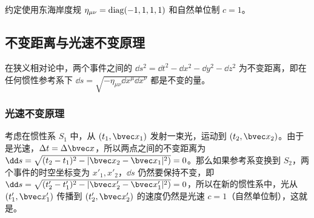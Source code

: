 

约定使用东海岸度规 $\eta_{\mu\nu}=\rm{diag}(-1,1,1,1)$ 和自然单位制 $c=1$。
\subsection{不变距离与光速不变原理}
在狭义相对论中，两个事件之间的 $\dd s^2=\dd t^2-\dd x^2-\dd y^2-\dd z^2$ 为不变距离，即在任何惯性参考系下 $\dd s=\sqrt{-\eta_{\mu\nu}\dd x^\mu \dd x^\nu}$ 都是不变的量。

\subsubsection{光速不变原理}

考虑在惯性系 $S_1$ 中，从 $(t_1,\bvec x_1)$ 发射一束光，运动到 $(t_2,\bvec x_2)$。由于是光速，$\Delta t=\Delta \bvec x$，所以两点之间的不变距离为 $\dd s=\sqrt{(t_2-t_1)^2-|\bvec x_2-\bvec x_1|^2)}=0$。那么如果参考系变换到 $S_2$，两个事件的时空坐标变为 $x'_1,x'_2$，$\dd s$ 仍然要保持不变，即 $\dd s=\sqrt{(t'_2-t'_1)^2-|\bvec x'_2-\bvec x'_1|^2)}=0$，所以在新的惯性系中，光从 $(t'_1,\bvec x'_1)$ 传播到 $(t'_2,\bvec x'_2)$ 的速度仍然是光速 $c=1$（自然单位制），这就是\tex。